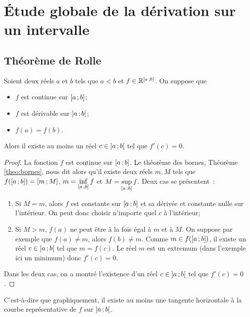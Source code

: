 \section{Étude globale de la dérivation sur un intervalle}

\subsection{Théorème de Rolle}

\begin{theo}
  Soient deux réels \(a\) et \(b\) tels que \(a < b\) et \(f \in 
  \mathbb{R}^{\left[ a \, ;  b \right]}\). On suppose que
  \begin{itemize}
    \item \(f\) est continue sur \(\left[ a \, ;  b \right]\);
    \item \(f\) est dérivable sur \(\left] a \, ;  b \right[\);
    \item \(f(a)=f(b)\).
  \end{itemize}
  Alors il existe au moins un réel \(c \in \left] a \, ;  b \right[\) tel que 
  \(f'(c)=0\).
\end{theo}
\begin{proof}
  La fonction \(f\) est continue sur \(\left[ a \, ;  b \right]\). Le théorème des 
  bornes, Théorème
  \ref{theo:bornes}, nous dit alors qu'il existe deux réels \(m,M\) tels que 
  \(f(\left[ a \, ;  b \right])=\left[ m \, ;  M \right]\), \(m = 
  \inf\limits_{\left[ a \, ;  b \right]} f\) et \(M = 
  \sup\limits_{\left[ a \, ;  b \right]} f\). Deux cas se présentent~:
  \begin{enumerate}
    \item Si \(M=m\), alors \(f\) est constante sur \(\left[ a \, ;  b \right]\) et 
      sa dérivée et constante nulle sur l'intérieur. On peut donc choisir 
      n'importe quel \(c\) à l'intérieur;
    \item Si \(M > m\), \(f(a)\) ne peut être à la fois égal à \(m\) et à \(M\). 
      On suppose par exemple que \(f(a) \neq m\), alors \(f(b) \neq m\). Comme 
      \(m \in f(\left[ a \, ;  b \right])\), il existe un réel \(c \in 
      \left] a \, ;  b \right[\) tel que \(m=f(c)\). Le réel \(m\) est un extremum 
      (dans l'exemple ici un minimum) donc \(f'(c)=0\).
  \end{enumerate}
  Dans les deux cas, on a montré l'existence d'un réel \(c \in 
  \left] a \, ;  b \right[\) tel que \(f'(c)=0\).
\end{proof}

C'est-à-dire que graphiquement, il existe au moins une tangente horizontale à la 
courbe représentative de \(f\) sur \(\left] a \, ;  b \right[\).

